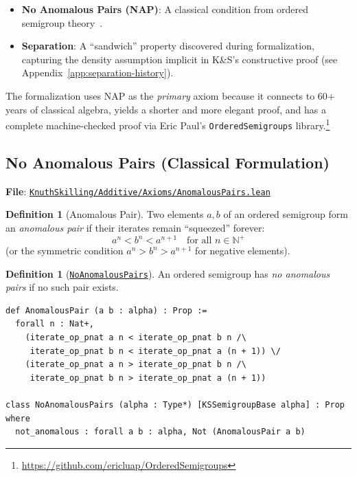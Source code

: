 \documentclass[11pt]{article}
\theoremstyle{definition}
\newtheorem{definition}[theorem]{Definition}
\theoremstyle{remark}
\begin{document}
\begin{itemize}
\item \textbf{No Anomalous Pairs (NAP)}: A classical condition from ordered semigroup theory~\cite{Alimov1950,Fuchs1963}.
\item \textbf{Separation}: A ``sandwich'' property discovered during formalization, capturing the
      density assumption implicit in K\&S's constructive proof (see Appendix~\ref{app:separation-history}).
\end{itemize}

The formalization uses NAP as the \emph{primary} axiom because it connects to 60+ years of
classical algebra, yields a shorter and more elegant proof, and has a complete machine-checked
proof via Eric Paul's \texttt{OrderedSemigroups} library.\footnote{\url{https://github.com/ericluap/OrderedSemigroups}}

\subsection{No Anomalous Pairs (Classical Formulation)}
\label{subsec:nap}

\textbf{File}: \href{https://github.com/zariuq/ks-foundations-of-inference/blob/main/KnuthSkilling/Additive/Axioms/AnomalousPairs.lean}{\texttt{KnuthSkilling/Additive/Axioms/AnomalousPairs.lean}}

\begin{definition}[Anomalous Pair]
Two elements $a, b$ of an ordered semigroup form an \emph{anomalous pair} if their iterates remain
``squeezed'' forever:
\[
  a^n < b^n < a^{n+1} \quad \text{for all } n \in \mathbb{N}^+
\]
(or the symmetric condition $a^n > b^n > a^{n+1}$ for negative elements).
\end{definition}

\begin{definition}[\href{https://github.com/zariuq/ks-foundations-of-inference/blob/main/KnuthSkilling/Additive/Axioms/AnomalousPairs.lean\#L66}{\texttt{NoAnomalousPairs}}]
An ordered semigroup has \emph{no anomalous pairs} if no such pair exists.
\end{definition}

\begin{lstlisting}[caption={NAP definition (following Eric Paul's OrderedSemigroups)}]
def AnomalousPair (a b : alpha) : Prop :=
  forall n : Nat+,
    (iterate_op_pnat a n < iterate_op_pnat b n /\
     iterate_op_pnat b n < iterate_op_pnat a (n + 1)) \/
    (iterate_op_pnat a n > iterate_op_pnat b n /\
     iterate_op_pnat b n > iterate_op_pnat a (n + 1))

class NoAnomalousPairs (alpha : Type*) [KSSemigroupBase alpha] : Prop where
  not_anomalous : forall a b : alpha, Not (AnomalousPair a b)
\end{lstlisting}
\end{document}
